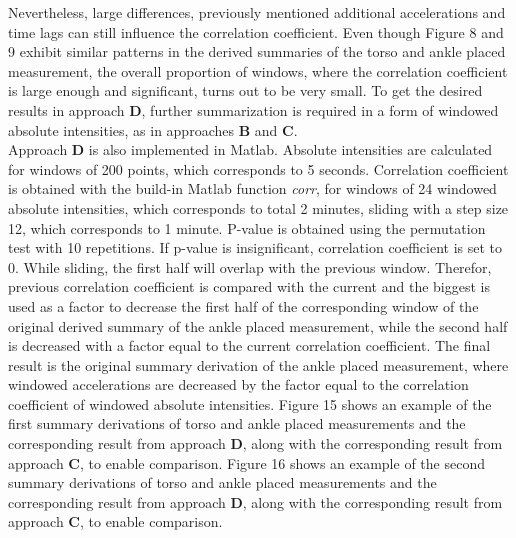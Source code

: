 \documentclass{article}
\begin{document}
{Nevertheless, large differences, previously mentioned additional accelerations and time lags can still influence the correlation coefficient. Even though Figure 8 and 9 exhibit similar patterns in the derived summaries of the torso and ankle placed measurement, the overall proportion of windows, where the correlation coefficient is large enough and significant, turns out to be very small. To get the desired results in approach \textbf{D}, further summarization is required in a form of windowed absolute intensities, as in approaches \textbf{B} and \textbf{C}.\\ 
Approach \textbf{D} is also implemented in Matlab. Absolute intensities are calculated for windows of 200 points, which corresponds to 5 seconds. Correlation coefficient is obtained with the build-in Matlab function \textit{corr}, for windows of 24 windowed absolute intensities, which corresponds to total 2 minutes, sliding with a step size 12, which corresponds to 1 minute. P-value is obtained using the permutation test with 10 repetitions. If p-value is insignificant, correlation coefficient is set to 0. While sliding, the first half will overlap with the previous window. Therefor, previous correlation coefficient is compared with the current and the biggest is used as a factor to decrease the first half of the corresponding window of the original derived summary of the ankle placed measurement, while the second half is decreased with a factor equal to the current correlation coefficient. The final result is the original summary derivation of the ankle placed measurement, where windowed accelerations are decreased by the factor equal to the correlation coefficient of windowed absolute intensities. Figure 15 shows an example of the first summary derivations of torso and ankle placed measurements and the corresponding result from approach \textbf{D}, along with the corresponding result from approach \textbf{C}, to enable comparison. Figure 16 shows an example of the second summary derivations of torso and ankle placed measurements and the corresponding result from approach \textbf{D}, along with the corresponding result from approach \textbf{C}, to enable comparison.

}
\end{document}
